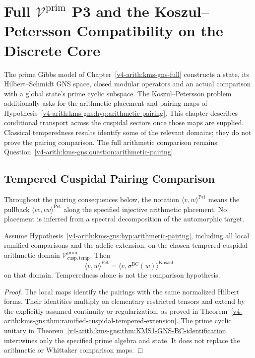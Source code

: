 \chapter{Full \(\mathcal{V}^{\mathrm{prim}}\) P3 and the Koszul--Petersson Compatibility on the Discrete Core}
\label{v4-arith:w5-c:full-vprim-P3}

The prime Gibbs model of Chapter~\ref{v4-arith:kms-gns-full}
constructs a state, its Hilbert--Schmidt GNS space, closed modular
operators and an actual comparison with a global state's prime
cyclic subspace. The Koszul--Petersson problem additionally asks
for the arithmetic placement and pairing maps of
Hypothesis~\ref{v4-arith:kms-gns:hyp:arithmetic-pairing}.
This chapter describes conditional transport across the cuspidal
sectors once those maps are supplied. Classical temperedness
results identify some of the relevant domains; they do not prove
the pairing comparison. The full arithmetic comparison remains
Question~\ref{v4-arith:kms-gns:question:arithmetic-pairing}.

\section{Tempered Cuspidal Pairing Comparison}
\label{v4-arith:w5-c:recap-tempered}

Throughout the pairing consequences below, the notation
\(\langle v,w\rangle^{\mathrm{Pet}}\) means the pullback
\(\langle\iota v,\iota w\rangle^{\mathrm{Pet}}\) along the specified
injective arithmetic placement. No placement is inferred from a
spectral decomposition of the automorphic target.

\begin{theorem}
\label{v4-arith:w5-c:thm:tempered-recap}
Assume Hypothesis~\ref{v4-arith:kms-gns:hyp:arithmetic-pairing},
including all local ramified comparisons and the adelic extension,
on the chosen tempered cuspidal arithmetic domain
\(\mathcal V^{\mathrm{prim}}_{\mathrm{cusp,temp}}\). Then
\begin{equation}
\label{v4-arith:w5-c:eq:tempered-recap}
 \langle v,w\rangle^{\mathrm{Pet}}
 =\langle v,\sigma^{\mathrm{BC}}(w)\rangle^{\mathrm{Koszul}}
\end{equation}
on that domain. Temperedness alone is not the comparison hypothesis.
\end{theorem}
\begin{proof}
The local maps identify the pairings with the same normalized
Hilbert forms. Their identities multiply on elementary restricted
tensors and extend by the explicitly assumed continuity or
regularization, as proved in
Theorem~\ref{v4-arith:kms-gns:thm:ramified-cuspidal-tempered-extension}.
The prime cyclic unitary in
Theorem~\ref{v4-arith:kms-gns:thm:KMS1-GNS-BC-identification}
intertwines only the specified prime algebra and state. It does
not replace the arithmetic or Whittaker comparison maps.
\end{proof}

